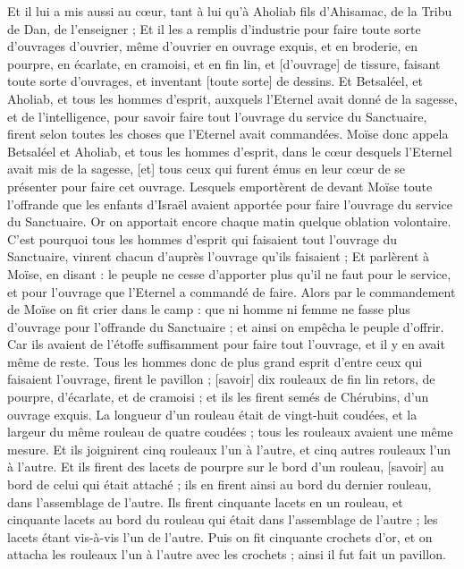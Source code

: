 \begin{multicols}{2}
Et il lui a mis aussi au cœur, tant à lui qu'à Aholiab fils d'Ahisamac, de la Tribu de Dan, de l'enseigner ;
Et il les a remplis d'industrie pour faire toute sorte d’ouvrages d'ouvrier, même d'ouvrier en ouvrage exquis, et en broderie, en pourpre, en écarlate, en cramoisi, et en fin lin, et [d'ouvrage] de tissure, faisant toute sorte d'ouvrages, et inventant [toute sorte] de dessins.
\VerseOne{}Et Betsaléel, et Aholiab, et tous les hommes d'esprit, auxquels l'Eternel avait donné de la sagesse, et de l'intelligence, pour savoir faire tout l'ouvrage du service du Sanctuaire, firent selon toutes les choses que l'Eternel avait commandées.
Moïse donc appela Betsaléel et Aholiab, et tous les hommes d'esprit, dans le cœur desquels l'Eternel avait mis de la sagesse, [et] tous ceux qui furent émus en leur cœur de se présenter pour faire cet ouvrage.
Lesquels emportèrent de devant Moïse toute l'offrande que les enfants d'Israël avaient apportée pour faire l'ouvrage du service du Sanctuaire. Or on apportait encore chaque matin quelque oblation volontaire.
C'est pourquoi tous les hommes d'esprit qui faisaient tout l'ouvrage du Sanctuaire, vinrent chacun d'auprès l'ouvrage qu'ils faisaient ;
Et parlèrent à Moïse, en disant : le peuple ne cesse d'apporter plus qu'il ne faut pour le service, et pour l'ouvrage que l'Eternel a commandé de faire.
Alors par le commandement de Moïse on fit crier dans le camp : que ni homme ni femme ne fasse plus d'ouvrage pour l'offrande du Sanctuaire ; et ainsi on empêcha le peuple d'offrir.
Car ils avaient de l'étoffe suffisamment pour faire tout l'ouvrage, et il y en avait même de reste.
Tous les hommes donc de plus grand esprit d'entre ceux qui faisaient l'ouvrage, firent le pavillon ; [savoir] dix rouleaux de fin lin retors, de pourpre, d'écarlate, et de cramoisi ; et ils les firent semés de Chérubins, d'un ouvrage exquis.
La longueur d'un rouleau était de vingt-huit coudées, et la largeur du même rouleau de quatre coudées ; tous les rouleaux avaient une même mesure.
Et ils joignirent cinq rouleaux l'un à l'autre, et cinq autres rouleaux l'un à l'autre.
Et ils firent des lacets de pourpre sur le bord d'un rouleau, [savoir] au bord de celui qui était attaché ; ils en firent ainsi au bord du dernier rouleau, dans l'assemblage de l'autre.
Ils firent cinquante lacets en un rouleau, et cinquante lacets au bord du rouleau qui était dans l'assemblage de l'autre ; les lacets étant vis-à-vis l'un de l'autre.
Puis on fit cinquante crochets d'or, et on attacha les rouleaux l'un à l'autre avec les crochets ; ainsi il fut fait un pavillon.

\end{multicols}
